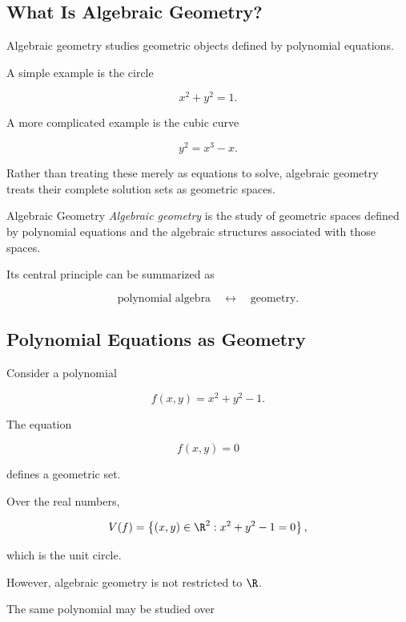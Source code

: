 \subsection{What Is Algebraic Geometry?}
\label{subsec:what-is-algebraic-geometry}

Algebraic geometry studies geometric objects defined by polynomial
equations.

A simple example is the circle

\[
x^2+y^2=1.
\]

A more complicated example is the cubic curve

\[
y^2=x^3-x.
\]

Rather than treating these merely as equations to solve, algebraic geometry
treats their complete solution sets as geometric spaces.

\begin{definitionbox}{Algebraic Geometry}
\emph{Algebraic geometry} is the study of geometric spaces defined by
polynomial equations and the algebraic structures associated with those
spaces.
\end{definitionbox}

Its central principle can be summarized as

\[
\boxed{
\text{polynomial algebra}
\quad\longleftrightarrow\quad
\text{geometry}.
}
\]

\subsection{Polynomial Equations as Geometry}
\label{subsec:polynomial-equations-as-geometry}

Consider a polynomial

\[
f(x,y)=x^2+y^2-1.
\]

The equation

\[
f(x,y)=0
\]

defines a geometric set.

Over the real numbers,

\[
V(f)
=
\left\{
(x,y)\in\R^2:
x^2+y^2-1=0
\right\},
\]

which is the unit circle.

However, algebraic geometry is not restricted to \(\R\).

The same polynomial may be studied over

